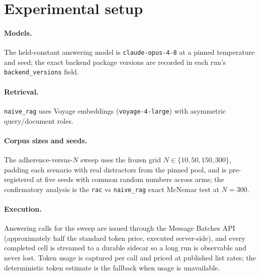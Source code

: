 \section{Experimental setup}

\paragraph{Models.} The held-constant answering model is \texttt{claude-opus-4-8}
at a pinned temperature and seed; the exact backend package versions are recorded
in each run's \texttt{backend\_versions} field. 

\paragraph{Retrieval.} \texttt{naive\_rag} uses Voyage embeddings
(\texttt{voyage-4-large}) with asymmetric query/document roles. 

\paragraph{Corpus sizes and seeds.} The adherence-versus-$N$ sweep uses the
frozen grid $N \in \{10, 50, 150, 300\}$, padding each scenario with real
distractors from the pinned pool, and is pre-registered at five seeds with
common random numbers across arms; the confirmatory analysis is the
\texttt{rac} vs \texttt{naive\_rag} exact McNemar test at $N{=}300$.

\paragraph{Execution.} Answering calls for the sweep are issued through the
Message Batches API (approximately half the standard token price, executed
server-side), and every completed cell is streamed to a durable sidecar so a long
run is observable and never lost. Token usage is captured per call and priced at
published list rates; the deterministic token estimate is the fallback when usage
is unavailable.
